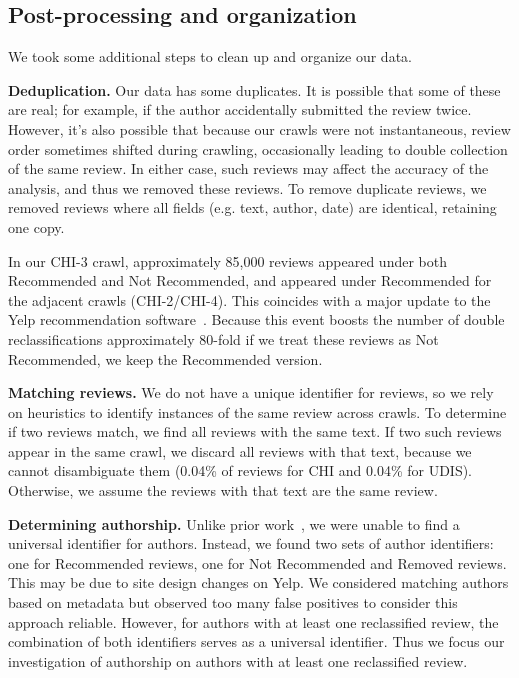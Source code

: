 

\subsection{Post-processing and organization}

We took some additional steps to clean up and organize our data.

\textbf{Deduplication.}
Our data has some duplicates. It is possible that some of these are real; for example, if the author accidentally submitted the review twice. However, it's also possible that because our crawls were not instantaneous, review order sometimes shifted during crawling, occasionally leading to double collection of the same review. In either case, such reviews may affect the accuracy of the analysis, and thus we removed these reviews.
To remove duplicate reviews, we removed reviews where all fields (e.g. text, author, date) are identical, retaining one copy.

In our CHI-3 crawl,
approximately 85,000 reviews appeared under both Recommended and Not Recommended, and appeared under Recommended for the adjacent crawls (CHI-2/CHI-4). This coincides with a major update to the Yelp recommendation software~\cite{yelp2021updates}. Because this event boosts the number of double reclassifications approximately 80-fold if we treat these reviews as Not Recommended, we keep the Recommended version.

\textbf{Matching reviews.}
We do not have a unique identifier for reviews, so we rely on heuristics to identify instances of the same review across crawls. To determine if two reviews match, we find all reviews with the same text. If two such reviews appear in the same crawl, we discard all reviews with that text, because we cannot disambiguate them (0.04\% of reviews for CHI and 0.04\% for UDIS). Otherwise, we assume the reviews with that text are the same review.

\textbf{Determining authorship.}
Unlike prior work~\cite{mukherjee2013yelp,rayana2015collective}, we were unable to find a universal identifier for authors. Instead, we found two sets of author identifiers: one for Recommended reviews, one for Not Recommended and Removed reviews. This may be due to site design changes on Yelp.
We considered matching authors based on metadata but observed too many false positives to consider this approach reliable. 
However, for authors with at least one reclassified review, the combination of both identifiers serves as a universal identifier. Thus we focus our investigation of authorship on authors with at least one reclassified review.

